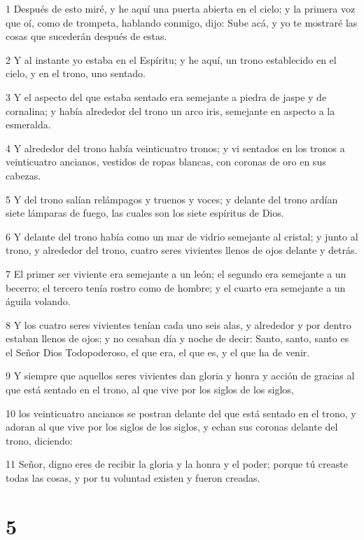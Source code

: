 \par 1 Después de esto miré, y he aquí una puerta abierta en el cielo; y la primera voz que oí, como de trompeta, hablando conmigo, dijo: Sube acá, y yo te mostraré las cosas que sucederán después de estas.
\par 2 Y al instante yo estaba en el Espíritu; y he aquí, un trono establecido en el cielo, y en el trono, uno sentado.
\par 3 Y el aspecto del que estaba sentado era semejante a piedra de jaspe y de cornalina; y había alrededor del trono un arco iris, semejante en aspecto a la esmeralda.
\par 4 Y alrededor del trono había veinticuatro tronos; y vi sentados en los tronos a veinticuatro ancianos, vestidos de ropas blancas, con coronas de oro en sus cabezas.
\par 5 Y del trono salían relámpagos y truenos y voces; y delante del trono ardían siete lámparas de fuego, las cuales son los siete espíritus de Dios.
\par 6 Y delante del trono había como un mar de vidrio semejante al cristal; y junto al trono, y alrededor del trono, cuatro seres vivientes llenos de ojos delante y detrás.
\par 7 El primer ser viviente era semejante a un león; el segundo era semejante a un becerro; el tercero tenía rostro como de hombre; y el cuarto era semejante a un águila volando.
\par 8 Y los cuatro seres vivientes tenían cada uno seis alas, y alrededor y por dentro estaban llenos de ojos; y no cesaban día y noche de decir: Santo, santo, santo es el Señor Dios Todopoderoso, el que era, el que es, y el que ha de venir.
\par 9 Y siempre que aquellos seres vivientes dan gloria y honra y acción de gracias al que está sentado en el trono, al que vive por los siglos de los siglos,
\par 10 los veinticuatro ancianos se postran delante del que está sentado en el trono, y adoran al que vive por los siglos de los siglos, y echan sus coronas delante del trono, diciendo:
\par 11 Señor, digno eres de recibir la gloria y la honra y el poder; porque tú creaste todas las cosas, y por tu voluntad existen y fueron creadas.

\chapter{5}

